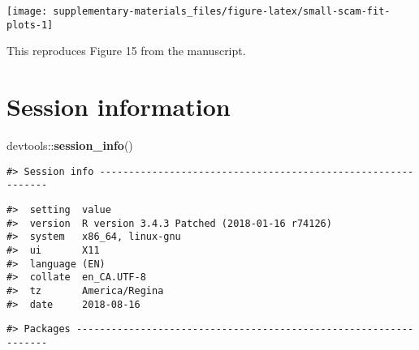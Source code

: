 \documentclass[12pt,]{article}
\newenvironment{Shaded}{\begin{snugshade}}{\end{snugshade}}
\newcommand{\KeywordTok}[1]{\textcolor[rgb]{0.13,0.29,0.53}{\textbf{{#1}}}}
\newcommand{\NormalTok}[1]{{#1}}
\begin{document}
\begin{center}\texttt{[image: supplementary-materials\_files/figure-latex/small-scam-fit-plots-1]} \end{center}

This reproduces Figure 15 from the manuscript.

\section{Session information}\label{session-information}

\begin{Shaded}
\begin{Highlighting}[]
\NormalTok{devtools::}\KeywordTok{session_info}\NormalTok{()}
\end{Highlighting}
\end{Shaded}

\begin{verbatim}
#> Session info -------------------------------------------------------------
\end{verbatim}

\begin{verbatim}
#>  setting  value                                      
#>  version  R version 3.4.3 Patched (2018-01-16 r74126)
#>  system   x86_64, linux-gnu                          
#>  ui       X11                                        
#>  language (EN)                                       
#>  collate  en_CA.UTF-8                                
#>  tz       America/Regina                             
#>  date     2018-08-16
\end{verbatim}

\begin{verbatim}
#> Packages -----------------------------------------------------------------
\end{verbatim}
\end{document}

